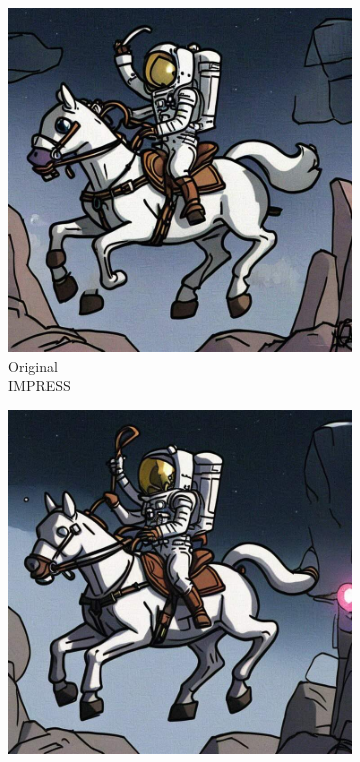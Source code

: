 \documentclass{article}
\begin{document}
\begin{figure}[h]
    \centering
    \captionsetup[subfigure]{justification=centering}
    \begin{subfigure}{0.3\textwidth}
    \centering
    \includegraphics[width=\textwidth]{plots/impressplus/antidb_nulevoy_revopt.jpeg}
    \caption{Original\\IMPRESS}
    \end{subfigure}
    \hfill
    \begin{subfigure}{0.3\textwidth}
    \centering
    \includegraphics[width=\textwidth]{plots/impressplus/antidb_nulevoy_impress_negprompt.jpeg}

\end{subfigure}
\end{figure}
\end{document}
